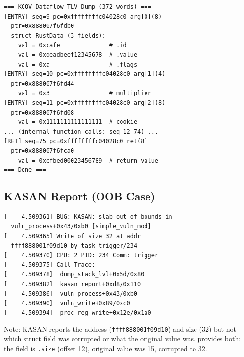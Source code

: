 \documentclass{ndss}
\begin{document}
\begin{lstlisting}[numbers=none]
=== KCOV Dataflow TLV Dump (372 words) ===
[ENTRY] seq=9 pc=0xffffffffc04028c0 arg[0](8)
  ptr=0x888007f6fdb0
  struct RustData (3 fields):
    val = 0xcafe              # .id
    val = 0xdeadbeef12345678  # .value
    val = 0xa                 # .flags
[ENTRY] seq=10 pc=0xffffffffc04028c0 arg[1](4)
  ptr=0x888007f6fd44
    val = 0x3                 # multiplier
[ENTRY] seq=11 pc=0xffffffffc04028c0 arg[2](8)
  ptr=0x888007f6fd08
    val = 0x1111111111111111  # cookie
... (internal function calls: seq 12-74) ...
[RET] seq=75 pc=0xffffffffc04028c0 ret(8)
  ptr=0x888007f6fca0
    val = 0xefbed00023456789  # return value
=== Done ===
\end{lstlisting}

\subsection{KASAN Report (OOB Case)}

\begin{lstlisting}[numbers=none]
[    4.509361] BUG: KASAN: slab-out-of-bounds in
  vuln_process+0x43/0xb0 [simple_vuln_mod]
[    4.509365] Write of size 32 at addr
  ffff888001f09d10 by task trigger/234
[    4.509370] CPU: 2 PID: 234 Comm: trigger
[    4.509375] Call Trace:
[    4.509378]  dump_stack_lvl+0x5d/0x80
[    4.509382]  kasan_report+0xd8/0x110
[    4.509386]  vuln_process+0x43/0xb0
[    4.509390]  vuln_write+0x89/0xc0
[    4.509394]  proc_reg_write+0x12e/0x1a0
\end{lstlisting}

Note: KASAN reports the address (\texttt{ffff888001f09d10}) and size (32) but
not which struct field was corrupted or what the original value was. \toolname{}
provides both: the field is \texttt{.size} (offset 12), original value was 15,
corrupted to 32.
\end{document}
